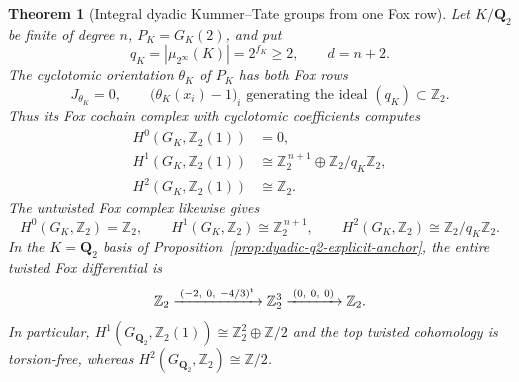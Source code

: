 \documentclass[11pt]{article}
\newtheorem{theorem}{Theorem}[section]
\theoremstyle{definition}
\begin{document}
\begin{theorem}[Integral dyadic Kummer--Tate groups from one Fox row]
\label{thm:dyadic-fox-kummer-tate}
Let $K/\mathbf Q_2$ be finite of degree $n$,
$P_K=G_K(2)$, and put
\[
q_K=|\mu_{2^\infty}(K)|=2^{f_K}\ge2,
\qquad d=n+2.
\]
The cyclotomic orientation $\theta_K$ of $P_K$
has both Fox rows
\begin{equation}\label{eq:dyadic-kummer-fox-rows}
J_{\theta_K}=0,\qquad
\bigl(\theta_K(x_i)-1\bigr)_i
\text{ generating the ideal }(q_K)\subset\mathbb Z_2.
\end{equation}
Thus its Fox cochain complex with cyclotomic
coefficients computes
\begin{equation}\label{eq:dyadic-kummer-tate-groups}
\boxed{
\begin{aligned}
H^0(G_K,\mathbb Z_2(1))&=0,\\
H^1(G_K,\mathbb Z_2(1))
  &\cong\mathbb Z_2^{\,n+1}
     \oplus\mathbb Z_2/q_K\mathbb Z_2,\\
H^2(G_K,\mathbb Z_2(1))&\cong\mathbb Z_2.
\end{aligned}}
\end{equation}
The untwisted Fox complex likewise gives
\begin{equation}\label{eq:dyadic-untwisted-tate-groups}
H^0(G_K,\mathbb Z_2)=\mathbb Z_2,\qquad
H^1(G_K,\mathbb Z_2)\cong\mathbb Z_2^{\,n+1},\qquad
H^2(G_K,\mathbb Z_2)\cong
   \mathbb Z_2/q_K\mathbb Z_2.
\end{equation}
In the $K=\mathbf Q_2$ basis of
Proposition~\ref{prop:dyadic-q2-explicit-anchor},
the entire twisted Fox differential is
\begin{equation}\label{eq:dyadic-q2-twisted-complex}
\mathbb Z_2
\xrightarrow{\;(-2,\ 0,\ -4/3)^{\rm t}\;}
\mathbb Z_2^3
\xrightarrow{\;(0,\ 0,\ 0)\;}
\mathbb Z_2.
\end{equation}
In particular,
$H^1(G_{\mathbf Q_2},\mathbb Z_2(1))
\cong\mathbb Z_2^2\oplus\mathbb Z/2$
and the top twisted cohomology is torsion-free,
whereas
$H^2(G_{\mathbf Q_2},\mathbb Z_2)
\cong\mathbb Z/2$.
\end{theorem}
\end{document}
